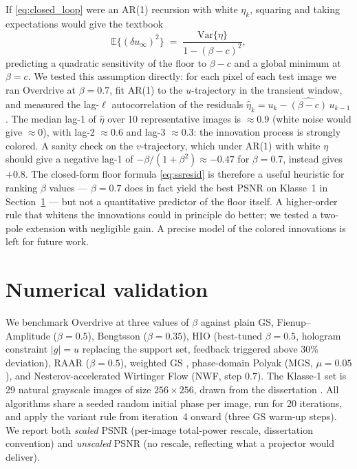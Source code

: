 \documentclass[11pt,a4paper]{article}
\begin{document}
If \eqref{eq:closed_loop} were an AR(1) recursion with white $\eta_k$,
squaring and taking expectations would give the textbook
\begin{equation}
  \mathbb{E}\{(\delta u_\infty)^2\}
    \;=\; \frac{\mathrm{Var}\{\eta\}}{1 - (\beta - c)^2},
  \label{eq:ssresid}
\end{equation}
predicting a quadratic sensitivity of the floor to $\beta-c$ and a global
minimum at $\beta=c$. We tested this assumption directly: for each pixel
of each test image we ran Overdrive at $\beta=0.7$, fit AR(1) to the
$u$-trajectory in the transient window, and measured the lag-$\ell$
autocorrelation of the residuals $\hat\eta_k = u_k -
\widehat{(\beta-c)}\,u_{k-1}$. The median lag-1 of $\hat\eta$ over 10
representative images is $\approx 0.9$ (white noise would give $\approx 0$),
with lag-2 $\approx 0.6$ and lag-3 $\approx 0.3$: the innovation process is
strongly colored. A sanity check on the $v$-trajectory, which under
AR(1) with white $\eta$ should give a negative lag-1 of
$-\beta/(1+\beta^2)\approx -0.47$ for $\beta=0.7$, instead gives $+0.8$.
The closed-form floor formula \eqref{eq:ssresid} is therefore a useful
heuristic for ranking $\beta$ values --- $\beta=0.7$ does in fact yield
the best PSNR on Klasse~1 in Section~\ref{sec:numerics} --- but not a
quantitative predictor of the floor itself. A higher-order rule that
whitens the innovations could in principle do better; we tested a
two-pole extension with negligible gain. A precise model of the colored
innovations is left for future work.

\section{Numerical validation}\label{sec:numerics}

We benchmark Overdrive at three values of $\beta$ against plain GS,
Fienup--Amplitude ($\beta=0.5$), Bengtsson ($\beta=0.35$), HIO
\cite{Fienup1982} (best-tuned $\beta=0.5$, hologram constraint
$|g|=u$ replacing the support set, feedback triggered above $30\%$
deviation), RAAR \cite{Luke2005} ($\beta=0.5$), weighted GS
\cite{DiLeonardo2007}, phase-domain Polyak (MGS, $\mu=0.05$), and
Nesterov-accelerated Wirtinger Flow \cite{Candes2014} (NWF,
step $0.7$). The Klasse-1 set is 29 natural grayscale images of size
$256\times 256$, drawn from the dissertation
\cite{Bernau2012,Sheikh2005}. All algorithms share a seeded random initial
phase per image, run for 20 iterations, and apply the variant rule from
iteration~4 onward (three GS warm-up steps). We report both \emph{scaled}
PSNR (per-image total-power rescale, dissertation convention) and
\emph{unscaled} PSNR (no rescale, reflecting what a projector would
deliver).
\end{document}

